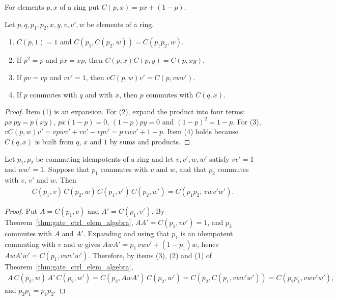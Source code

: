 \begin{definition}
    \label{def:gate_ctrl_elem}
    \leanok
    For elements $p,x$ of a ring put $C(p,x)=px+(1-p)$.
\end{definition}

\begin{theorem}
    \label{thm:gate_ctrl_elem_algebra}
    \leanok
    Let $p,q,p_1,p_2,x,y,v,v',w$ be elements of a ring.
    \begin{enumerate}
        \item $C(p,1)=1$ and $C(p_1,C(p_2,w))=C(p_1p_2,w)$.
        \item If $p^2=p$ and $px=xp$, then $C(p,x)C(p,y)=C(p,xy)$.
        \item If $pv=vp$ and $vv'=1$, then $vC(p,w)v'=C(p,vwv')$.
        \item If $p$ commutes with $q$ and with $x$, then $p$ commutes with
              $C(q,x)$.
    \end{enumerate}
\end{theorem}
\begin{proof}\leanok
    Item (1) is an expansion. For (2), expand the product into four terms:
    $px\,py=p(xy)$, $px(1-p)=0$, $(1-p)py=0$ and $(1-p)^2=1-p$. For (3),
    $vC(p,w)v'=vpwv'+vv'-vpv'=p\,vwv'+1-p$. Item (4) holds because $C(q,x)$
    is built from $q$, $x$ and $1$ by sums and products.
\end{proof}

\begin{theorem}
    \label{thm:gate_ctrl_elem_commutator}
    \leanok
    Let $p_1,p_2$ be commuting idempotents of a ring and let $v,v',w,w'$
    satisfy $vv'=1$ and $ww'=1$. Suppose that $p_1$ commutes with $v$ and
    $w$, and that $p_2$ commutes with $v$, $v'$ and $w$. Then
    \begin{align}
        C(p_1,v)\,C(p_2,w)\,C(p_1,v')\,C(p_2,w')=C(p_1p_2,\,vwv'w').
        \label{eq:gate_ctrl_commutator}
    \end{align}
\end{theorem}
\begin{proof}\leanok
    Put $A=C(p_1,v)$ and $A'=C(p_1,v')$. By
    Theorem~\ref{thm:gate_ctrl_elem_algebra}, $AA'=C(p_1,vv')=1$, and $p_2$
    commutes with $A$ and $A'$. Expanding and using that $p_1$ is an
    idempotent commuting with $v$ and $w$ gives
    $AwA'=p_1\,vwv'+(1-p_1)w$, hence $AwA'w'=C(p_1,vwv'w')$. Therefore, by
    items (3), (2) and (1) of Theorem~\ref{thm:gate_ctrl_elem_algebra},
    \begin{align}
        A\,C(p_2,w)\,A'\,C(p_2,w')
        =C(p_2,AwA')\,C(p_2,w')
        =C(p_2,C(p_1,vwv'w'))
        =C(p_2p_1,vwv'w'),
    \end{align}
    and $p_2p_1=p_1p_2$.
\end{proof}


